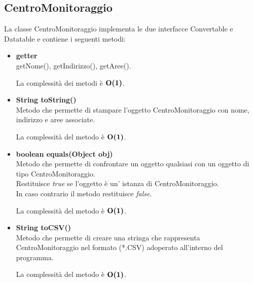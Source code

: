 \documentclass[a4paper, 12pt]{scrreprt}
\begin{document}
			\subsection{CentroMonitoraggio}
			La classe CentroMonitoraggio implementa le due interfacce Convertable e Datatable e contiene i seguenti metodi:
			\begin{itemize}
				\item \textbf{getter}
				\\getNome(), getIndirizzo(), getAree().
				
				La complessit\`a dei metodi \`e $\mathbf{O}\textbf{(1)}$.
				
				\item \textbf{String toString()}
				\\Metodo che permette di stampare l'oggetto CentroMonitoraggio con nome, indirizzo e aree associate.
				
				La complessit\`a del metodo \`e $\mathbf{O}\textbf{(1)}$.
				
				\item \textbf{boolean equals(Object obj)}
				\\Metodo che permette di confrontare un oggetto qualsiasi con un oggetto di tipo CentroMonitoraggio.
				\\Restituisce \textit{true} se l'oggetto \`e un' istanza di CentroMonitoraggio.
				\\In caso contrario il metodo restituisce \textit{false}.
				
				La complessit\`a del metodo \`e $\mathbf{O}\textbf{(1)}$.
				
				\item \textbf{String toCSV()}
				\\Metodo che permette di creare una stringa che rappresenta CentroMonitoraggio nel formato (*.CSV) adoperato all'interno del programma.
				
				La complessit\`a del metodo \`e $\mathbf{O}\textbf{(1)}$.
				
			\end{itemize}
\end{document}
